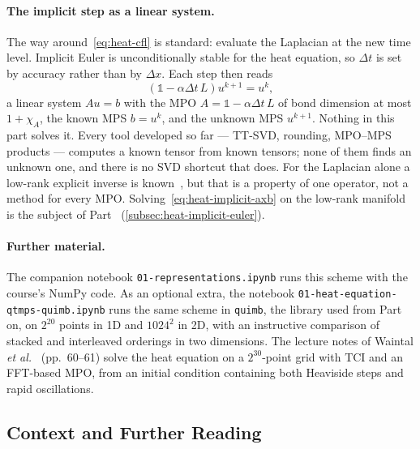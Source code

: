 \paragraph{The implicit step as a linear system.}
The way around~\eqref{eq:heat-cfl} is standard: evaluate the Laplacian at the
new time level. Implicit Euler is unconditionally stable for the heat
equation, so $\Delta t$ is set by accuracy rather than by $\Delta x$. Each step
then reads
\begin{equation}
  \left(\mathbb{1} - \alpha \Delta t\, L\right) u^{k+1} = u^{k},
  \label{eq:heat-implicit-axb}
\end{equation}%
a linear system $Au = b$ with the MPO $A = \mathbb{1} - \alpha\Delta t\, L$ of
bond dimension at most $1 + \chi_A$, the known MPS $b = u^k$, and the unknown
MPS $u^{k+1}$. Nothing in this part solves it. Every tool developed so far
--- TT-SVD, rounding, MPO--MPS products --- computes a known tensor from known
tensors; none of them finds an unknown one, and there is no SVD shortcut that
does. For the Laplacian alone a low-rank explicit inverse is
known~\cite{Kazeev2012}, but that is a property of one operator, not a method
for every MPO. Solving~\eqref{eq:heat-implicit-axb} on the low-rank manifold is
the subject of Part~ (\cref{subsec:heat-implicit-euler}).

\paragraph{Further material.}
The companion notebook \texttt{01-representations.ipynb} runs this scheme with
the course's NumPy code. As an optional extra, the notebook
\texttt{01-heat-equation-qtmps-quimb.ipynb} runs the same scheme in
\texttt{quimb}, the library used from Part~ on, on $2^{20}$ points in
1D and $1024^2$ in 2D, with an instructive comparison of stacked and
interleaved orderings in two dimensions. The lecture notes of Waintal \emph{et
al.}~\cite{Waintal2026} (pp.~60--61) solve the heat equation on a
$2^{30}$-point grid with TCI and an FFT-based MPO, from an initial condition
containing both Heaviside steps and rapid oscillations.

\subsection{Context and Further Reading}
\label{subsec:literature-survey}

